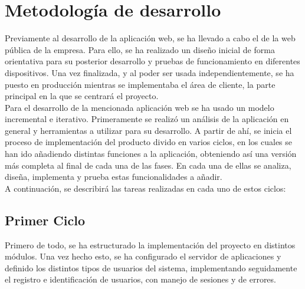 


\section{Metodologí­a de desarrollo}

Previamente al desarrollo de la aplicación web, se ha llevado a cabo el de la web pública de la empresa. Para ello, se ha realizado un diseño inicial de forma orientativa para su posterior desarrollo y pruebas de funcionamiento en diferentes dispositivos. Una vez finalizada, y al poder ser usada independientemente, se ha puesto en producción mientras se implementaba el área de cliente, la parte principal en la que se centrará el proyecto.
\\

Para el desarrollo de la mencionada aplicación web se ha usado un modelo incremental e iterativo. Primeramente se realizó un análisis de la aplicación en general y herramientas a utilizar para su desarrollo. A partir de ahí, se inicia el proceso de implementación del producto divido en varios ciclos, en los cuales se han ido añadiendo distintas funciones a la aplicación, obteniendo así una versión más completa al final de cada una de las fases. En cada una de ellas se analiza, diseña, implementa y prueba estas funcionalidades a añadir.
\\

A continuación, se describirá las tareas realizadas en cada uno de estos ciclos:

\subsection{Primer Ciclo}

Primero de todo, se ha estructurado la implementación del proyecto en distintos módulos. Una vez hecho esto, se ha configurado el servidor de aplicaciones y definido los distintos tipos de usuarios del sistema, implementando seguidamente el registro e identificación de usuarios, con manejo de sesiones y de errores.
\\

